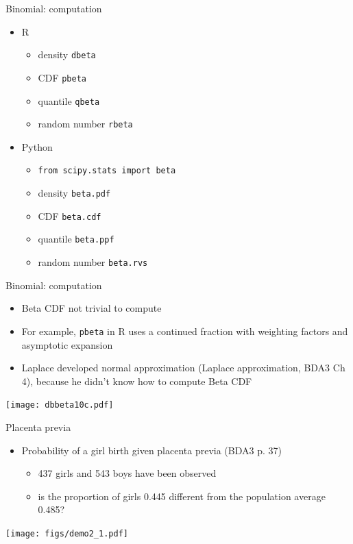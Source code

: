 \documentclass[english,t]{beamer}
\begin{document}
\begin{frame}{Binomial: computation}

  \begin{itemize}
  \item R
    \begin{itemize}
    \item density {\tt dbeta}
    \item CDF {\tt pbeta}
    \item quantile {\tt qbeta}
    \item random number {\tt rbeta}
    \end{itemize}
  \item Python
    \begin{itemize}
    \item {\tt from scipy.stats import beta}
    \item density {\tt beta.pdf}
    \item CDF {\tt beta.cdf}
    \item quantile {\tt beta.ppf}
    \item random number {\tt beta.rvs}
    \end{itemize}
  \end{itemize}

\end{frame}

\begin{frame}{Binomial: computation}

  \begin{itemize}
  \item Beta CDF not trivial to compute
  \item For example, {\tt pbeta} in R uses a continued fraction with
    weighting factors and asymptotic expansion
  \item Laplace developed normal approximation (Laplace
    approximation, BDA3 Ch 4), because he didn't know how to compute Beta CDF
  \end{itemize}

  \begin{center}
    {\texttt{[image: dbbeta10c.pdf]}}
  \end{center}
  
\end{frame}

\begin{frame}{Placenta previa}

  \begin{itemize}
  \item Probability of a girl birth given placenta previa (BDA3 p. 37)
    \begin{itemize}
    \item 437 girls and 543 boys have been observed
    \item is the proportion of girls 0.445 different from the population average 0.485?
    \end{itemize}
  \end{itemize}
  \pause
  \texttt{[image: figs/demo2\_1.pdf]}
\end{frame}
\end{document}
